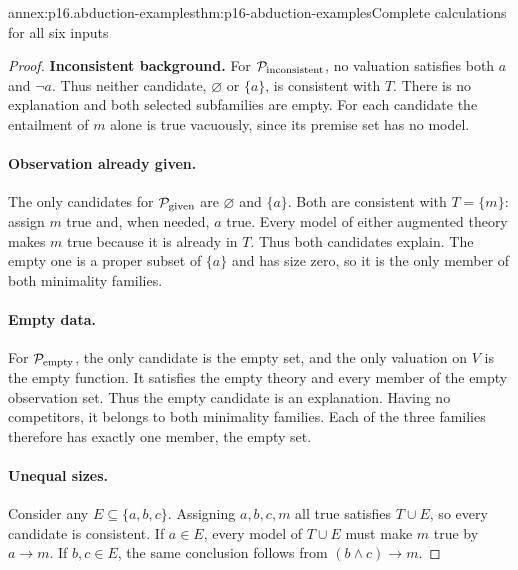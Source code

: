 \begin{annexitem}{annex:p16.abduction-examples}{thm:p16-abduction-examples}{Complete calculations for all six inputs}
\begin{proof}
\textbf{Inconsistent background.}\enspace
For \(\mathcal P_{\rm inconsistent}\), no valuation satisfies both
\(a\) and \(\neg a\). Thus neither candidate, \(\varnothing\)
or \(\{a\}\), is consistent with \(T\). There is no explanation
and both selected subfamilies are empty. For each candidate the entailment
of \(m\) alone is true vacuously, since its premise set has no model.

\paragraph{Observation already given.}
The only candidates for \(\mathcal P_{\rm given}\) are
\(\varnothing\) and \(\{a\}\). Both are consistent with
\(T=\{m\}\): assign \(m\) true and, when needed, \(a\) true.
Every model of either augmented theory makes \(m\) true because it is
already in \(T\). Thus both candidates explain. The empty one is a
proper subset of \(\{a\}\) and has size zero, so it is the only
member of both minimality families.

\paragraph{Empty data.}
For \(\mathcal P_{\rm empty}\), the only candidate is the empty set,
and the only valuation on \(V\) is the empty function. It satisfies
the empty theory and every member of the empty observation set. Thus the
empty candidate is an explanation. Having no competitors, it belongs to
both minimality families. Each of the three families therefore has exactly
one member, the empty set.

\paragraph{Unequal sizes.}
Consider any \(E\subseteq\{a,b,c\}\). Assigning \(a,b,c,m\) all
true satisfies \(T\cup E\), so every candidate is consistent. If
\(a\in E\), every model of \(T\cup E\) must make \(m\) true
by \(a\to m\). If \(b,c\in E\), the same conclusion follows
from \((b\land c)\to m\).


\end{proof}
\end{annexitem}
